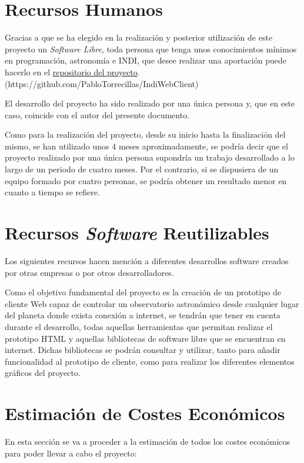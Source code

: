 \section{Recursos Humanos}
Gracias a que se ha elegido en la realización y posterior utilización de este proyecto un \textit{Software Libre}, toda persona que tenga unos conocimientos mínimos en programación, astronomía e INDI, que desee realizar una aportación puede hacerlo en el \href{https://github.com/PabloTorrecillas/IndiWebClient}{repositorio del proyecto}.\\
(https://github.com/PabloTorrecillas/IndiWebClient)

El desarrollo del proyecto ha sido realizado por una única persona y, que en este caso, coincide con el autor del presente documento.

Como para la realización del proyecto, desde su inicio hasta la finalización del mismo, se han utilizado unos 4 meses aproximadamente, se podría decir que el proyecto realizado por una única persona supondría un trabajo desarrollado a lo largo de un periodo de cuatro meses. Por el contrario, si se dispusiera de un equipo formado por cuatro personas, se podría obtener un resultado menor en cuanto a tiempo se refiere.
\section{Recursos \textit{Software} Reutilizables}
Los siguientes recursos hacen mención a diferentes desarrollos software creados por otras empresas o por otros desarrolladores.

Como el objetivo fundamental del proyecto es la creación de un prototipo de cliente Web capaz de controlar un observatorio astronómico desde cualquier lugar del planeta donde exista conexión a internet, se tendrán que tener en cuenta durante el desarrollo, todas aquellas herramientas que permitan realizar el prototipo HTML y aquellas bibliotecas de software libre que se encuentran en internet. Dichas bibliotecas se podrán consultar y utilizar, tanto para añadir funcionalidad al prototipo de cliente, como para realizar los diferentes elementos gráficos del proyecto.

\section{Estimación de Costes Económicos}
En esta sección se va a proceder a la estimación de todos los costes económicos para poder llevar a cabo el proyecto:

